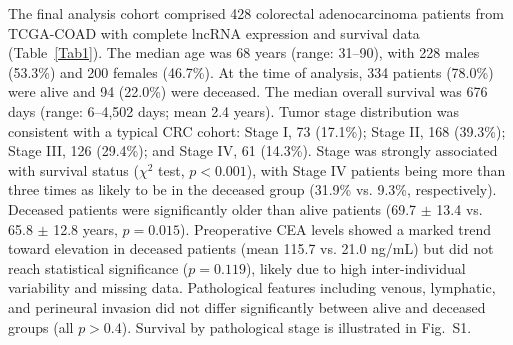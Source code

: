 \documentclass[fleqn,10pt]{wlscirep}
\begin{document}
The final analysis cohort comprised 428 colorectal adenocarcinoma patients from TCGA-COAD with complete lncRNA expression and survival data (Table~\ref{Tab1}). The median age was 68 years (range: 31--90), with 228 males (53.3\%) and 200 females (46.7\%). At the time of analysis, 334 patients (78.0\%) were alive and 94 (22.0\%) were deceased. The median overall survival was 676 days (range: 6--4,502 days; mean 2.4 years). Tumor stage distribution was consistent with a typical CRC cohort: Stage I, 73 (17.1\%); Stage II, 168 (39.3\%); Stage III, 126 (29.4\%); and Stage IV, 61 (14.3\%). Stage was strongly associated with survival status ($\chi^2$ test, $p < 0.001$), with Stage IV patients being more than three times as likely to be in the deceased group (31.9\% vs. 9.3\%, respectively). Deceased patients were significantly older than alive patients (69.7 $\pm$ 13.4 vs. 65.8 $\pm$ 12.8 years, $p = 0.015$). Preoperative CEA levels showed a marked trend toward elevation in deceased patients (mean 115.7 vs. 21.0 ng/mL) but did not reach statistical significance ($p = 0.119$), likely due to high inter-individual variability and missing data. Pathological features including venous, lymphatic, and perineural invasion did not differ significantly between alive and deceased groups (all $p > 0.4$). Survival by pathological stage is illustrated in Fig.~S1.
\end{document}
